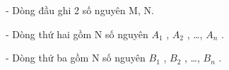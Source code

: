 - Dòng đầu ghi 2 số nguyên M, N.  

   - Dòng thứ hai gồm N số nguyên $A_{1}$   , $A_{2}$   , …, $A_{n}$   .  

   - Dòng thứ ba gồm N số nguyên $B_{1}$   , $B_{2}$   , …, $B_{n}$   .